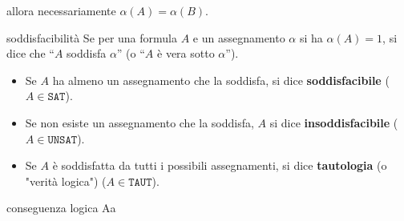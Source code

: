 \documentclass[a4paper,12pt]{report}
\begin{document}
        allora necessariamente \( \alpha(A) = \alpha(B) \).

        \begin{gbox}[colframe=PineGreen]{soddisfacibilità}
            Se per una formula \( A \) e un assegnamento \( \alpha \) si ha \( \alpha (A) = 1 \), si dice che ``\(A \) soddisfa \( \alpha \)'' (o ``\( A \) è vera sotto \( \alpha \)'').
            \begin{itemize}
                \item Se \( A \) ha almeno un assegnamento che la soddisfa, si dice \textbf{soddisfacibile} (\( A \in \texttt{SAT} \)).
                \item Se non esiste un assegnamento che la soddisfa, \( A \) si dice \textbf{insoddisfacibile} (\( A \in \texttt{UNSAT} \)).
                \item Se \( A \) è soddisfatta da tutti i possibili assegnamenti, si dice \textbf{tautologia} (o "verità logica") (\( A \in \texttt{TAUT} \)).
            \end{itemize}
        \end{gbox}


        \begin{defbox}{conseguenza logica}{}
            Aa
        \end{defbox}
\end{document}
